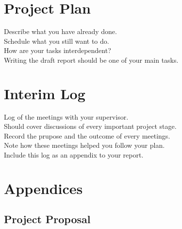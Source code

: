 \documentclass[a4paper, 12pt]{article}
\begin{document}
    \clearpage
    \section{Project Plan}
        Describe what you have already done. \\
        Schedule what you still want to do. \\
        How are your tasks interdependent? \\
        Writing the draft report should be one of your main tasks.

    \section{Interim Log}
        Log of the meetings with your supervisor. \\
        Should cover discussions of every important project stage. \\
        Record the prupose and the outcome of every meetings. \\
        Note how these meetings helped you follow your plan. \\
        Include this log as an appendix to your report.
    
    \section{Appendices}
        \subsection{Project Proposal}

    \printbibliography
\end{document}
